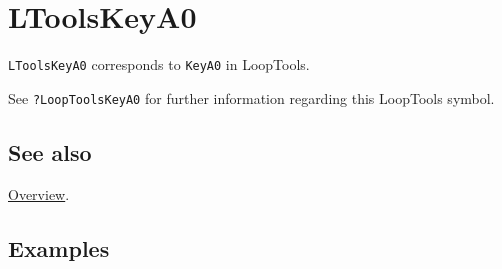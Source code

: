 \documentclass[../FeynHelpersManual.tex]{subfiles}
\begin{document}
\hypertarget{ltoolskeya0}{
\section{LToolsKeyA0}\label{ltoolskeya0}}

\texttt{LToolsKeyA0} corresponds to \texttt{KeyA0} in LoopTools.

See \texttt{?LoopTools\textasciigrave KeyA0} for further information
regarding this LoopTools symbol.

\subsection{See also}

\hyperlink{toc}{Overview}.

\subsection{Examples}
\end{document}

